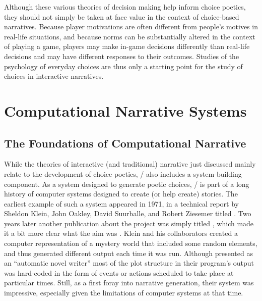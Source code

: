 Although these various theories of decision making help inform choice poetics, they should not simply be taken at face value in the context of choice-based narratives.
%
Because player motivations are often different from people's motives in real-life situations, and because norms can be substantially altered in the context of playing a game, players may make in-game decisions differently than real-life decisions and may have different responses to their outcomes.
%
Studies of the psychology of everyday choices are thus only a starting point for the study of choices in interactive narratives.



\section{Computational Narrative Systems}

\subsection{The Foundations of Computational Narrative}

While the theories of interactive (and traditional) narrative just discussed mainly relate to the development of choice poetics, \dunyazad/ also includes a system-building component.
%
As a system designed to generate poetic choices, \dunyazad/ is part of a long history of computer systems designed to create (or help create) stories.
%
The earliest example of such a system appeared in 1971, in a technical report by Sheldon Klein, John Oakley, David Suurballe, and Robert Ziesemer titled  \citep{Klein1971}.
%
Two years later another publication about the project was simply titled , which made it a bit more clear what the aim was \citep{Klein1973}.
%
Klein and his collaborators created a computer representation of a mystery world that included some random elements, and thus generated different output each time it was run.
%
Although presented as an ``automatic novel writer'' most of the plot structure in their program's output was hard-coded in the form of events or actions scheduled to take place at particular times.
%
Still, as a first foray into narrative generation, their system was impressive, especially given the limitations of computer systems at that time.


